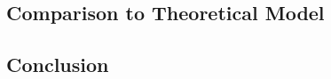 \documentclass[]{article}
\begin{document}
\begin{comment}
	\begin{figure}[H]
		\begin{center}
			\begin{tikzpicture}
				\begin{axis}[
					height=10cm,width=13cm, 
					title={Measured Performance with $d = 1024$},
					xlabel={Particle Count},
					ylabel={Execution Time (ms)},
					]
					
					\foreach \i in {0,...,3}{
						\pgfmathsetmacro\suffix{int(pow(2,\i))};
						
						\addplot +[] 
						table [col sep=comma, x=N, y=time] 
						{../../code/out/measurements\suffix.csv};
						
						\addlegendentryexpanded{\# $\suffix$};
						
					}	
				\end{axis}
			\end{tikzpicture}
		\end{center}
	\end{figure}
\end{comment}


\subsection{Comparison to Theoretical Model}


\subsection{Conclusion}


%

\end{document}
